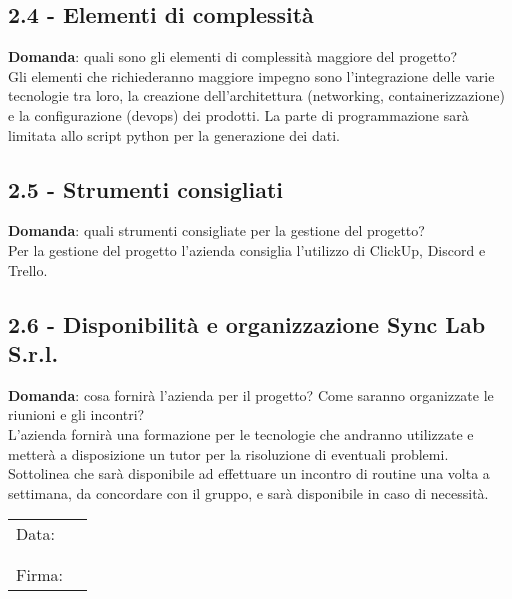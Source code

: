 \documentclass[italian,12pt]{article} %
\begin{document}
\begin{flushleft}
\subsection*{2.4 - Elementi di complessità}
	\textbf{Domanda}: quali sono gli elementi di complessità maggiore del progetto?\\
	Gli elementi che richiederanno maggiore impegno sono l'integrazione delle varie tecnologie tra loro, la creazione dell'architettura (networking, containerizzazione) e la configurazione (devops) dei prodotti. La parte di programmazione sarà limitata allo script python per la generazione dei dati.

\subsection*{2.5 - Strumenti consigliati}
	\textbf{Domanda}: quali strumenti consigliate per la gestione del progetto?\\
	Per la gestione del progetto l'azienda consiglia l'utilizzo di ClickUp, Discord e Trello.

\subsection*{2.6 - Disponibilità e organizzazione Sync Lab S.r.l.}
	\textbf{Domanda}: cosa fornirà l'azienda per il progetto? Come saranno organizzate le riunioni e gli incontri?\\
	L'azienda fornirà una formazione per le tecnologie che andranno utilizzate e metterà a disposizione un tutor per la risoluzione di eventuali problemi. Sottolinea che sarà disponibile ad effettuare un incontro di routine una volta a settimana, da concordare con il gruppo, e sarà disponibile in caso di necessità. 

\end{flushleft}

\begin{table}[b]
	\begin{tabular}{@{}p{.5in}p{4in}@{}}
		Data:  & \hrulefill \\
			   &     		\\
			   &     		\\
		Firma: & \hrulefill \\
	\end{tabular}
	\end{table}
\end{document}
